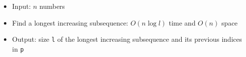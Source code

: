 \begin{itemize}
	\item Input: $n$ numbers
	\item Find a longest increasing subsequence: $O(n\log{l})$ time and $O(n)$ space
	\item Output: size \lstinline{l} of the longest increasing subsequence and its previous indices in \lstinline{p}
\end{itemize}
